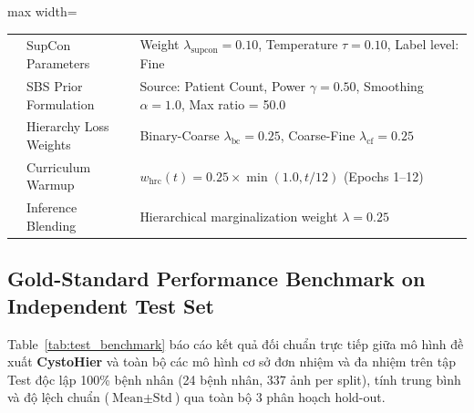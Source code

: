\documentclass[runningheads]{llncs}
\begin{document}
\begin{table}[t]
\begin{adjustbox}{max width=\textwidth}
\begin{tabular}{lll}
 & SupCon Parameters & Weight $\lambda_{\text{supcon}} = 0.10$, Temperature $\tau = 0.10$, Label level: Fine \\
 & SBS Prior Formulation & Source: Patient Count, Power $\gamma = 0.50$, Smoothing $\alpha = 1.0$, Max ratio = 50.0 \\
 & Hierarchy Loss Weights & Binary-Coarse $\lambda_{\text{bc}} = 0.25$, Coarse-Fine $\lambda_{\text{cf}} = 0.25$ \\
 & Curriculum Warmup & $w_{\text{hrc}}(t) = 0.25 \times \min(1.0, t/12)$ (Epochs 1--12) \\
 & Inference Blending & Hierarchical marginalization weight $\lambda = 0.25$ \\
\bottomrule
\end{tabular}
\end{adjustbox}
\end{table}

\subsection{Gold-Standard Performance Benchmark on Independent Test Set}
Table~\ref{tab:test_benchmark} báo cáo kết quả đối chuẩn trực tiếp giữa mô hình đề xuất \textbf{CystoHier} và toàn bộ các mô hình cơ sở đơn nhiệm và đa nhiệm trên tập Test độc lập 100\% bệnh nhân (24 bệnh nhân, 337 ảnh per split), tính trung bình và độ lệch chuẩn ($\text{Mean} \pm \text{Std}$) qua toàn bộ 3 phân hoạch hold-out.
\end{document}

